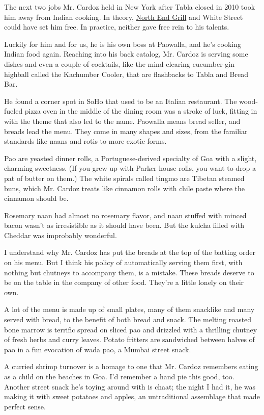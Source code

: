 The next two jobs Mr. Cardoz held in New York after Tabla closed in 2010
took him away from Indian cooking. In theory,
\href{http://www.nytimes3xbfgragh.onion/2015/01/28/dining/restaurant-review-blue-smoke-and-north-end-grill.html?_r=0}{North
End Grill} and White Street could have set him free. In practice,
neither gave free rein to his talents.

Luckily for him and for us, he is his own boss at Paowalla, and he's
cooking Indian food again. Reaching into his back catalog, Mr. Cardoz is
serving some dishes and even a couple of cocktails, like the
mind-clearing cucumber-gin highball called the Kachumber Cooler, that
are flashbacks to Tabla and Bread Bar.

He found a corner spot in SoHo that used to be an Italian restaurant.
The wood-fueled pizza oven in the middle of the dining room was a stroke
of luck, fitting in with the theme that also led to the name. Paowalla
means bread seller, and breads lead the menu. They come in many shapes
and sizes, from the familiar standards like naans and rotis to more
exotic forms.

Pao are yeasted dinner rolls, a Portuguese-derived specialty of Goa with
a slight, charming sweetness. (If you grew up with Parker house rolls,
you want to drop a pat of butter on them.) The white spirals called
tingmo are Tibetan steamed buns, which Mr. Cardoz treats like cinnamon
rolls with chile paste where the cinnamon should be.

Rosemary naan had almost no rosemary flavor, and naan stuffed with
minced bacon wasn't as irresistible as it should have been. But the
kulcha filled with Cheddar was improbably wonderful.

I understand why Mr. Cardoz has put the breads at the top of the batting
order on his menu. But I think his policy of automatically serving them
first, with nothing but chutneys to accompany them, is a mistake. These
breads deserve to be on the table in the company of other food. They're
a little lonely on their own.

A lot of the menu is made up of small plates, many of them snacklike and
many served with bread, to the benefit of both bread and snack. The
melting roasted bone marrow is terrific spread on sliced pao and
drizzled with a thrilling chutney of fresh herbs and curry leaves.
Potato fritters are sandwiched between halves of pao in a fun evocation
of wada pao, a Mumbai street snack.

A curried shrimp turnover is a homage to one that Mr. Cardoz remembers
eating as a child on the beaches in Goa. I'd remember a hand pie this
good, too. Another street snack he's toying around with is chaat; the
night I had it, he was making it with sweet potatoes and apples, an
untraditional assemblage that made perfect sense.

